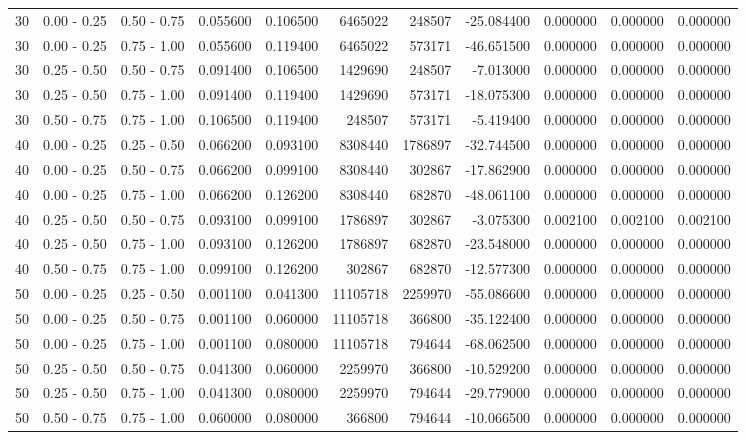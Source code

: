 \begin{table}
\begin{tabular}{rllrrrrrrrr}
30 & 0.00 - 0.25 & 0.50 - 0.75 & 0.055600 & 0.106500 & 6465022 & 248507 & -25.084400 & 0.000000 & 0.000000 & 0.000000 \\
30 & 0.00 - 0.25 & 0.75 - 1.00 & 0.055600 & 0.119400 & 6465022 & 573171 & -46.651500 & 0.000000 & 0.000000 & 0.000000 \\
30 & 0.25 - 0.50 & 0.50 - 0.75 & 0.091400 & 0.106500 & 1429690 & 248507 & -7.013000 & 0.000000 & 0.000000 & 0.000000 \\
30 & 0.25 - 0.50 & 0.75 - 1.00 & 0.091400 & 0.119400 & 1429690 & 573171 & -18.075300 & 0.000000 & 0.000000 & 0.000000 \\
30 & 0.50 - 0.75 & 0.75 - 1.00 & 0.106500 & 0.119400 & 248507 & 573171 & -5.419400 & 0.000000 & 0.000000 & 0.000000 \\
40 & 0.00 - 0.25 & 0.25 - 0.50 & 0.066200 & 0.093100 & 8308440 & 1786897 & -32.744500 & 0.000000 & 0.000000 & 0.000000 \\
40 & 0.00 - 0.25 & 0.50 - 0.75 & 0.066200 & 0.099100 & 8308440 & 302867 & -17.862900 & 0.000000 & 0.000000 & 0.000000 \\
40 & 0.00 - 0.25 & 0.75 - 1.00 & 0.066200 & 0.126200 & 8308440 & 682870 & -48.061100 & 0.000000 & 0.000000 & 0.000000 \\
40 & 0.25 - 0.50 & 0.50 - 0.75 & 0.093100 & 0.099100 & 1786897 & 302867 & -3.075300 & 0.002100 & 0.002100 & 0.002100 \\
40 & 0.25 - 0.50 & 0.75 - 1.00 & 0.093100 & 0.126200 & 1786897 & 682870 & -23.548000 & 0.000000 & 0.000000 & 0.000000 \\
40 & 0.50 - 0.75 & 0.75 - 1.00 & 0.099100 & 0.126200 & 302867 & 682870 & -12.577300 & 0.000000 & 0.000000 & 0.000000 \\
50 & 0.00 - 0.25 & 0.25 - 0.50 & 0.001100 & 0.041300 & 11105718 & 2259970 & -55.086600 & 0.000000 & 0.000000 & 0.000000 \\
50 & 0.00 - 0.25 & 0.50 - 0.75 & 0.001100 & 0.060000 & 11105718 & 366800 & -35.122400 & 0.000000 & 0.000000 & 0.000000 \\
50 & 0.00 - 0.25 & 0.75 - 1.00 & 0.001100 & 0.080000 & 11105718 & 794644 & -68.062500 & 0.000000 & 0.000000 & 0.000000 \\
50 & 0.25 - 0.50 & 0.50 - 0.75 & 0.041300 & 0.060000 & 2259970 & 366800 & -10.529200 & 0.000000 & 0.000000 & 0.000000 \\
50 & 0.25 - 0.50 & 0.75 - 1.00 & 0.041300 & 0.080000 & 2259970 & 794644 & -29.779000 & 0.000000 & 0.000000 & 0.000000 \\
50 & 0.50 - 0.75 & 0.75 - 1.00 & 0.060000 & 0.080000 & 366800 & 794644 & -10.066500 & 0.000000 & 0.000000 & 0.000000 \\

\end{tabular}
\end{table}
